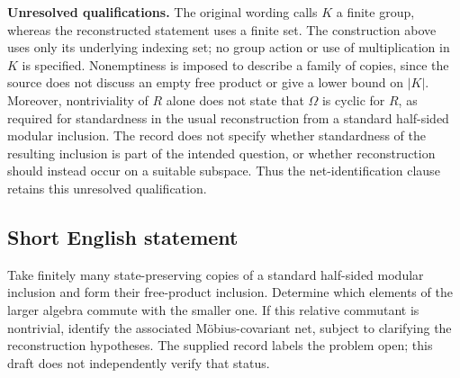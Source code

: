 \documentclass[11pt]{article}
\begin{document}
\textbf{Unresolved qualifications.} The original wording calls \(K\) a finite group, whereas the reconstructed statement uses a finite set. The construction above uses only its underlying indexing set; no group action or use of multiplication in \(K\) is specified. Nonemptiness is imposed to describe a family of copies, since the source does not discuss an empty free product or give a lower bound on \(|K|\). Moreover, nontriviality of \(R\) alone does not state that \(\Omega\) is cyclic for \(R\), as required for standardness in the usual reconstruction from a standard half-sided modular inclusion. The record does not specify whether standardness of the resulting inclusion is part of the intended question, or whether reconstruction should instead occur on a suitable subspace. Thus the net-identification clause retains this unresolved qualification.
\subsection{Short English statement}
Take finitely many state-preserving copies of a standard half-sided modular inclusion and form their free-product inclusion. Determine which elements of the larger algebra commute with the smaller one. If this relative commutant is nontrivial, identify the associated M\"obius-covariant net, subject to clarifying the reconstruction hypotheses. The supplied record labels the problem open; this draft does not independently verify that status.
\end{document}
